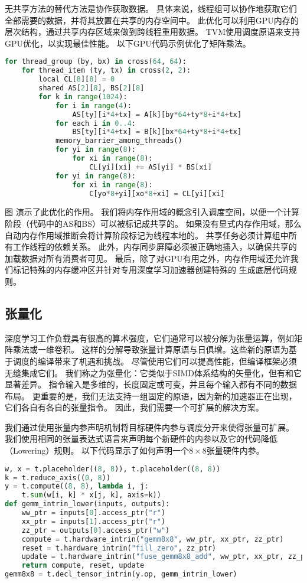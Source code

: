 无共享方法的替代方法是协作获取数据。
具体来说，线程组可以协作地获取它们全部需要的数据，并将其放置在共享的内存空间中。
此优化可以利用GPU内存的层次结构，通过共享内存区域来做到跨线程重用数据。
TVM使用调度原语来支持GPU优化，以实现最佳性能。
以下GPU代码示例优化了矩阵乘法。

\begin{lstlisting}[language={Python}]
for thread_group (by, bx) in cross(64, 64):
    for thread_item (ty, tx) in cross(2, 2):
        local CL[8][8] = 0
        shared AS[2][8], BS[2][8]
        for k in range(1024):
            for i in range(4):
                AS[ty][i*4+tx] = A[k][by*64+ty*8+i*4+tx]
            for each i in 0..4:
                BS[ty][i*4+tx] = B[k][bx*64+ty*8+i*4+tx]
            memory_barrier_among_threads()
            for yi in range(8):
                for xi in range(8):
                    CL[yi][xi] += AS[yi] * BS[xi]
            for yi in range(8):
                for xi in range(8):
                    C[yo*8+yi][xo*8+xi] = CL[yi][xi] 
\end{lstlisting}

图 演示了此优化的作用。
我们将内存作用域的概念引入调度空间，以便一个计算阶段（代码中的AS和BS）可以被标记成共享的。
如果没有显式内存作用域，那么自动内存作用域推断会将计算阶段标记为线程本地的。
共享任务必须计算组中所有工作线程的依赖关系。
此外，内存同步屏障必须被正确地插入，以确保共享的加载数据对所有消费者可见。
最后，除了对GPU有用之外，内存作用域还允许我们标记特殊的内存缓冲区并针对专用深度学习加速器创建特殊的
生成底层代码规则。

\subsection{张量化}
深度学习工作负载具有很高的算术强度，它们通常可以被分解为张量运算，例如矩阵乘法或一维卷积。
这样的分解导致张量计算原语与日俱增。这些新的原语为基于调度的编译带来了机遇和挑战。
尽管使用它们可以提高性能，但编译框架必须无缝集成它们。
我们称之为张量化：它类似于SIMD体系结构的矢量化，但有和它显著差异。
指令输入是多维的，长度固定或可变，并且每个输入都有不同的数据布局。
更重要的是，我们无法支持一组固定的原语，因为新的加速器正在出现，它们各自有各自的张量指令。
因此，我们需要一个可扩展的解决方案。

我们通过使用张量内参声明机制将目标硬件内参与调度分开来使得张量可扩展。
我们使用相同的张量表达式语言来声明每个新硬件的内参以及它的代码降低（Lowering）规则。
以下代码显示了如何声明一个$8\times 8$张量硬件内参。

\begin{lstlisting}[language={Python}]
w, x = t.placeholder((8, 8)), t.placeholder((8, 8))
k = t.reduce_axis((0, 8))
y = t.compute((8, 8), lambda i, j:
    t.sum(w[i, k] * x[j, k], axis=k))
def gemm_intrin_lower(inputs, outputs):
    ww_ptr = inputs[0].access_ptr("r")
    xx_ptr = inputs[1].access_ptr("r")
    zz_ptr = outputs[0].access_ptr("w")
    compute = t.hardware_intrin("gemm8x8", ww_ptr, xx_ptr, zz_ptr)
    reset = t.hardware_intrin("fill_zero", zz_ptr)
    update = t.hardware_intrin("fuse_gemm8x8_add", ww_ptr, xx_ptr, zz_ptr)
    return compute, reset, update
gemm8x8 = t.decl_tensor_intrin(y.op, gemm_intrin_lower) 
\end{lstlisting}

